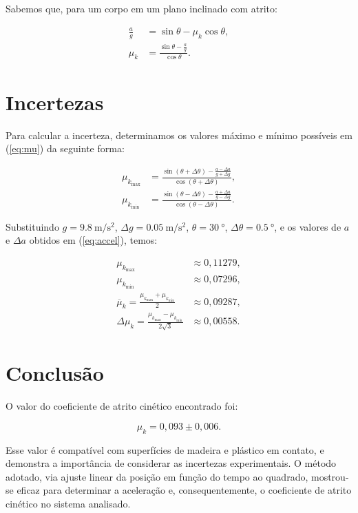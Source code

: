 \documentclass[10pt,oneside,twocolumn,a4paper]{article} %
\begin{document}
Sabemos que, para um corpo em um plano inclinado com atrito:

\begin{align}\label{eq:mu}
	\frac{a}{g} &= \sin\theta - \mu_k \cos\theta, \nonumber \\
	\mu_k &= \frac{\sin\theta - \frac{a}{g}}{\cos\theta}.
\end{align}

\section{Incertezas}

Para calcular a incerteza, determinamos os valores máximo e mínimo possíveis em
(\ref{eq:mu}) da seguinte forma:

\begin{align*}
	\mu_{k_\text{max}} &= \frac{\sin(\theta + \Delta\theta) - \frac{a - \Delta a}{g + \Delta g}}{\cos(\theta + \Delta\theta)}, \\
	\mu_{k_\text{min}} &= \frac{\sin(\theta - \Delta\theta) - \frac{a + \Delta a}{g - \Delta g}}{\cos(\theta - \Delta\theta)}.
\end{align*}


Substituindo $g = \SI{9.8}{\meter\per\second\squared}$, $\Delta g =
\SI{0.05}{\meter\per\second\squared}$, $\theta = \SI{30}{\degree}$,
$\Delta\theta = \SI{0.5}{\degree}$, e os valores de $a$ e $\Delta a$ obtidos em
(\ref{eq:accel}), temos:

\begin{align*}
	\mu_{k_\text{max}} &\approx 0,11279, \\
	\mu_{k_\text{min}} &\approx 0,07296, \\
	\overline\mu_k = \frac{\mu_{k_\text{max}} + \mu_{k_\text{min}}}{2} &\approx 0,09287, \\
	\Delta\mu_k = \frac{\mu_{k_\text{max}} - \mu_{k_\text{min}}}{2\sqrt{3}} &\approx 0,00558.
\end{align*}

\section{Conclusão}

O valor do coeficiente de atrito cinético encontrado foi:

\begin{equation*}
	\mu_k = 0,093 \pm 0,006.
\end{equation*}

Esse valor é compatível com superfícies de madeira e plástico em contato, e
demonstra a importância de considerar as incertezas experimentais. O método
adotado, via ajuste linear da posição em função do tempo ao quadrado,
mostrou-se eficaz para determinar a aceleração e, consequentemente, o
coeficiente de atrito cinético no sistema analisado.
\end{document}
